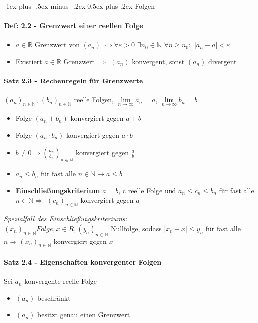 \documentclass[paper=a3,paper=landscape, fontsize=9pt,DIV=25]{scrartcl}
\makeatletter
\newcommand{\real}{{\mathbb{R}}}
\newcommand{\nat}{\mathbb{N}}
\renewcommand{\section}{\@startsection{section}{1}{0mm}%
                                {-1ex plus -.5ex minus -.2ex}%
                                {0.5ex plus .2ex}%
                                {\normalfont\large\bfseries}}
\makeatother
\begin{document}
\begin{multicols*}{4}

	\section{Folgen}
		\paragraph{Def: 2.2 - Grenzwert einer reellen Folge}
			\begin{itemize}
				\item $a \in \real$ Grenzwert von $(a_n)$ $\Leftrightarrow \forall \varepsilon > 0$ $\exists n_0 \in \nat$ $\forall n \geq n_0:$ $|a_n - a| < \varepsilon$
				\item Existiert $a \in \real$ Grenzwert $\Rightarrow$ $(a_n)$ konvergent, sonst $(a_n)$ divergent
			\end{itemize}
		\paragraph{Satz 2.3 - Rechenregeln für Grenzwerte}
			$(a_n)_{n \in \nat}$, $(b_n)_{n \in \nat}$ reelle Folgen, $\lim\limits_{n \rightarrow \infty} a_n = a$, $\lim\limits_{n \rightarrow \infty} b_n = b$
			\begin{itemize}
				\item Folge $(a_n + b_n)$ konvergiert gegen $a+b$
				\item Folge $(a_n \cdot b_n)$ konvergiert gegen $a \cdot b$
				\item $b \neq 0 \Rightarrow (\frac{a_n}{b_n})_{n \in \nat}$ konvergiert gegen $\frac{a}{b}$ 
				\item $a_n \leq b_n$ für fast alle $n \in \nat \rightarrow a \leq b$
				\item \textbf{Einschließungskriterium} $a=b$, c reelle Folge und $a_n \leq c_n \leq b_n$ für fast alle $n \in \nat \Rightarrow$ $(c_n)_{n \in \nat}$ konvergiert gegen $a$
			\end{itemize}
		\textit{Spezialfall des Einschließungskriteriums:}\\$(x_n)_{n \in \nat} Folge, x \in R, (y_n)_{n \in \nat}$ Nullfolge, sodass $|x_n -x| \leq y_n$ für fast alle $n \Rightarrow (x_n)_{n \in \nat}$ konvergiert gegen $x$
		\paragraph{Satz 2.4 - Eigenschaften konvergenter Folgen}
		Sei $a_n$ konvergente reelle Folge
		\begin{itemize}
			\item $(a_n)$ beschränkt
			\item $(a_n)$ besitzt genau einen Grenzwert
		\end{itemize}

\end{multicols*}
\end{document}
